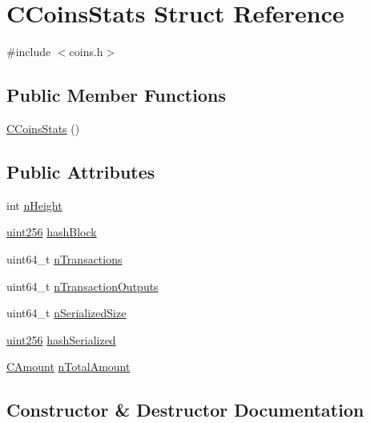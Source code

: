 \hypertarget{struct_c_coins_stats}{}\section{C\+Coins\+Stats Struct Reference}
\label{struct_c_coins_stats}


{\ttfamily \#include $<$coins.\+h$>$}

\subsection*{Public Member Functions}
\begin{DoxyCompactItemize}
\item 
\mbox{\hyperlink{struct_c_coins_stats_a3f68ce1f423e40599c8d3c4bf2d97aa9}{C\+Coins\+Stats}} ()
\end{DoxyCompactItemize}
\subsection*{Public Attributes}
\begin{DoxyCompactItemize}
\item 
int \mbox{\hyperlink{struct_c_coins_stats_a5972700c4733ce02e12530d758e95d8c}{n\+Height}}
\item 
\mbox{\hyperlink{classuint256}{uint256}} \mbox{\hyperlink{struct_c_coins_stats_a75b32757ea85b8df6453490e1acc4607}{hash\+Block}}
\item 
uint64\+\_\+t \mbox{\hyperlink{struct_c_coins_stats_a0b04da159443c350e9b9e8a39c6a82db}{n\+Transactions}}
\item 
uint64\+\_\+t \mbox{\hyperlink{struct_c_coins_stats_a02612be210ba7c628d04ddedd83b9ff0}{n\+Transaction\+Outputs}}
\item 
uint64\+\_\+t \mbox{\hyperlink{struct_c_coins_stats_ac4302ffc2f8be6e62dbc5655f77e4202}{n\+Serialized\+Size}}
\item 
\mbox{\hyperlink{classuint256}{uint256}} \mbox{\hyperlink{struct_c_coins_stats_a0ce8e745d7a62e4ae41f943333c81d7c}{hash\+Serialized}}
\item 
\mbox{\hyperlink{amount_8h_a4eaf3a5239714d8c45b851527f7cb564}{C\+Amount}} \mbox{\hyperlink{struct_c_coins_stats_a97c76344c650e55377d5f9246a906cc4}{n\+Total\+Amount}}
\end{DoxyCompactItemize}


\subsection{Constructor \& Destructor Documentation}
\mbox{\label{struct_c_coins_stats_a3f68ce1f423e40599c8d3c4bf2d97aa9}} 
